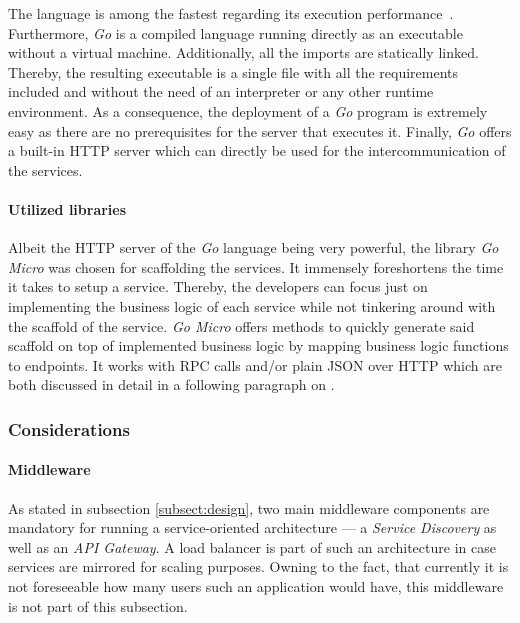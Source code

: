 \documentclass[12pt,a4paper]{report}
\begin{document}
The language is among the fastest regarding its execution performance~\cn.
Furthermore, \textit{Go} is a compiled language running directly as an executable
without a virtual machine. Additionally, all the imports are statically linked.
Thereby, the resulting executable is a single file with all the requirements
included and without the need of an interpreter or any other runtime environment.
As a consequence, the deployment of a \textit{Go} program is extremely easy as
there are no prerequisites for the server that executes it.
Finally, \textit{Go} offers a built-in HTTP server which can directly be used
for the intercommunication of the services.

\paragraph{Utilized libraries}
Albeit the HTTP server of the \textit{Go} language being very powerful,
the library \textit{Go Micro} was chosen for scaffolding the services.
It immensely foreshortens the time it takes to setup a service.
Thereby, the developers can focus just on implementing the business logic
of each service while not tinkering around with the scaffold of the service.
\textit{Go Micro} offers methods to quickly generate said scaffold on top
of implemented business logic by mapping business logic functions to endpoints.
It works with RPC calls and/or plain JSON over HTTP which are both discussed
in detail in a following paragraph on \textit{}.


\subsubsection{Considerations}

\paragraph{Middleware}
As stated in subsection \ref{subsect:design}, two main middleware components
are mandatory for running a service-oriented architecture ---
a \textit{Service Discovery} as well as an \textit{API Gateway}.
A load balancer is part of such an architecture in case services are mirrored
for scaling purposes. Owning to the fact, that currently it is not foreseeable
how many users such an application would have, this middleware is not part of
this subsection.
\end{document}
